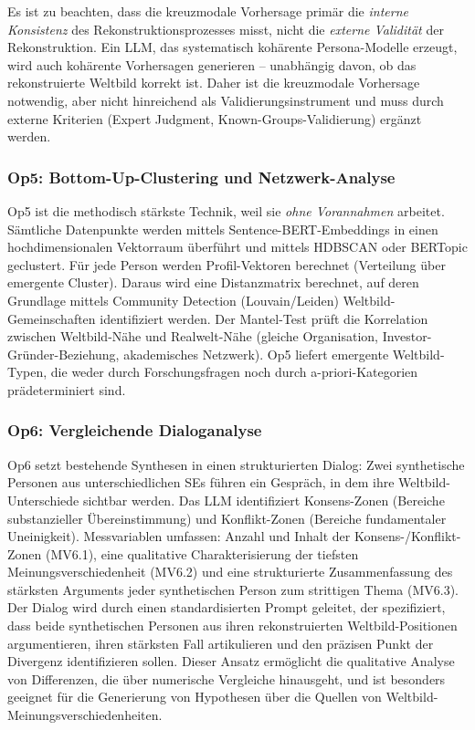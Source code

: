 \documentclass[11pt,a4paper]{article}
\theoremstyle{definition}
\theoremstyle{plain}
\theoremstyle{remark}
\begin{document}
Es ist zu beachten, dass die kreuzmodale Vorhersage prim\"ar die \emph{interne Konsistenz} des Rekonstruktionsprozesses misst, nicht die \emph{externe Validit\"at} der Rekonstruktion. Ein LLM, das systematisch koh\"arente Persona-Modelle erzeugt, wird auch koh\"arente Vorhersagen generieren -- unabh\"angig davon, ob das rekonstruierte Weltbild korrekt ist. Daher ist die kreuzmodale Vorhersage notwendig, aber nicht hinreichend als Validierungsinstrument und muss durch externe Kriterien (Expert Judgment, Known-Groups-Validierung) erg\"anzt werden.

\subsubsection{Op5: Bottom-Up-Clustering und Netzwerk-Analyse}

Op5 ist die methodisch st\"arkste Technik, weil sie \emph{ohne Vorannahmen} arbeitet. S\"amtliche Datenpunkte werden mittels Sentence-BERT-Embeddings \citep{Reimers2019} in einen hochdimensionalen Vektorraum \"uberf\"uhrt und mittels HDBSCAN \citep{McInnes2017} oder BERTopic \citep{Grootendorst2022} geclustert. F\"ur jede Person werden Profil-Vektoren berechnet (Verteilung \"uber emergente Cluster). Daraus wird eine Distanzmatrix berechnet, auf deren Grundlage mittels Community Detection (Louvain/Leiden) Weltbild-Gemeinschaften identifiziert werden. Der Mantel-Test pr\"uft die Korrelation zwischen Weltbild-N\"ahe und Realwelt-N\"ahe (gleiche Organisation, Investor-Gr\"under-Beziehung, akademisches Netzwerk). Op5 liefert emergente Weltbild-Typen, die weder durch Forschungsfragen noch durch a-priori-Kategorien pr\"adeterminiert sind.

\subsubsection{Op6: Vergleichende Dialoganalyse}

Op6 setzt bestehende Synthesen in einen strukturierten Dialog: Zwei synthetische Personen aus unterschiedlichen SEs f\"uhren ein Gespr\"ach, in dem ihre Weltbild-Unterschiede sichtbar werden. Das LLM identifiziert Konsens-Zonen (Bereiche substanzieller \"Ubereinstimmung) und Konflikt-Zonen (Bereiche fundamentaler Uneinigkeit). Messvariablen umfassen: Anzahl und Inhalt der Konsens-/Konflikt-Zonen (MV6.1), eine qualitative Charakterisierung der tiefsten Meinungsverschiedenheit (MV6.2) und eine strukturierte Zusammenfassung des st\"arksten Arguments jeder synthetischen Person zum strittigen Thema (MV6.3). Der Dialog wird durch einen standardisierten Prompt geleitet, der spezifiziert, dass beide synthetischen Personen aus ihren rekonstruierten Weltbild-Positionen argumentieren, ihren st\"arksten Fall artikulieren und den pr\"azisen Punkt der Divergenz identifizieren sollen. Dieser Ansatz erm\"oglicht die qualitative Analyse von Differenzen, die \"uber numerische Vergleiche hinausgeht, und ist besonders geeignet f\"ur die Generierung von Hypothesen \"uber die Quellen von Weltbild-Meinungsverschiedenheiten.
\end{document}
